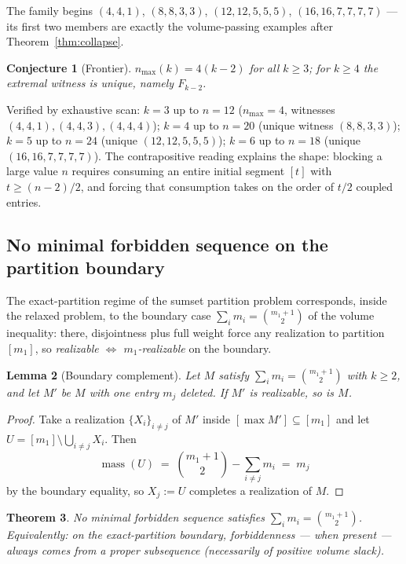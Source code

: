 \documentclass[11pt]{article}
\newtheorem{theorem}{Theorem}[section]
\newtheorem{lemma}[theorem]{Lemma}
\newtheorem{conjecture}[theorem]{Conjecture}
\theoremstyle{definition}
\theoremstyle{remark}
\newcommand{\mass}{\operatorname{mass}}
\newcommand{\intv}[1]{[#1]}
\begin{document}
The family begins $(4,4,1)$, $(8,8,3,3)$, $(12,12,5,5,5)$, $(16,16,7,7,7,7)$ --- its
first two members are exactly the volume-passing examples after
Theorem~\ref{thm:collapse}.

\begin{conjecture}[Frontier]\label{conj:frontier}
$n_{\max}(k)=4(k-2)$ for all $k\ge3$; for $k\ge4$ the extremal witness is unique,
namely $F_{k-2}$.
\end{conjecture}

Verified by exhaustive scan: $k=3$ up to $n=12$ ($n_{\max}=4$, witnesses
$(4,4,1),(4,4,3),(4,4,4)$); $k=4$ up to $n=20$ (unique witness $(8,8,3,3)$); $k=5$
up to $n=24$ (unique $(12,12,5,5,5)$); $k=6$ up to $n=18$ (unique
$(16,16,7,7,7,7)$). The contrapositive reading explains the shape: blocking a large
value $n$ requires consuming an entire initial segment $\intv t$ with
$t\ge(n-2)/2$, and forcing that consumption takes on the order of $t/2$ coupled
entries.

\subsection{No minimal forbidden sequence on the partition boundary}

The exact-partition regime of the sumset partition problem corresponds, inside the
relaxed problem, to the boundary case
$\sum_i m_i=\binom{m_1+1}{2}$ of the volume inequality: there, disjointness plus
full weight force any realization to partition $\intv{m_1}$, so
\emph{realizable $\Leftrightarrow$ $m_1$-realizable} on the boundary.

\begin{lemma}[Boundary complement]\label{lem:boundarycomp}
Let $M$ satisfy $\sum_im_i=\binom{m_1+1}{2}$ with $k\ge2$, and let $M'$ be $M$ with
one entry $m_j$ deleted. If $M'$ is realizable, so is $M$.
\end{lemma}

\begin{proof}
Take a realization $\{X_i\}_{i\neq j}$ of $M'$ inside
$\intv{\max M'}\subseteq\intv{m_1}$ and let
$U=\intv{m_1}\setminus\bigcup_{i\neq j}X_i$. Then
\[
\mass(U)\;=\;\binom{m_1+1}{2}-\sum_{i\neq j}m_i\;=\;m_j
\]
by the boundary equality, so $X_j:=U$ completes a realization of $M$.
\end{proof}

\begin{theorem}\label{thm:boundary}
No minimal forbidden sequence satisfies $\sum_im_i=\binom{m_1+1}{2}$. Equivalently:
on the exact-partition boundary, forbiddenness --- when present --- always comes from
a proper subsequence (necessarily of positive volume slack).
\end{theorem}
\end{document}
